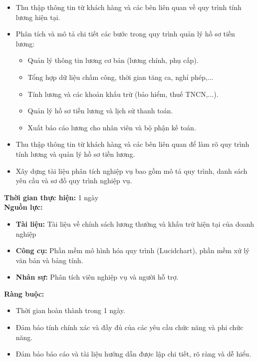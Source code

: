 {\begin{minipage}{\textwidth}
\begin{itemize}
        \begin{itemize}
            \item Thu thập thông tin từ khách hàng và các bên liên quan về quy trình tính lương hiện tại.
            \item Phân tích và mô tả chi tiết các bước trong quy trình quản lý hồ sơ tiền lương:
            \begin{itemize}
                \item Quản lý thông tin lương cơ bản (lương chính, phụ cấp).
                \item Tổng hợp dữ liệu chấm công, thời gian tăng ca, nghỉ phép,...
                \item Tính lương và các khoản khấu trừ (bảo hiểm, thuế TNCN,...).
                \item Quản lý hồ sơ tiền lương và lịch sử thanh toán.
                \item Xuất báo cáo lương cho nhân viên và bộ phận kế toán.
            \end{itemize}
            \item Thu thập thông tin từ khách hàng và các bên liên quan để làm rõ quy trình tính lương và quản lý hồ sơ tiền lương.
            \item Xây dựng tài liệu phân tích nghiệp vụ bao gồm mô tả quy trình, danh sách yêu cầu và sơ đồ quy trình nghiệp vụ.
        \end{itemize}
    \end{itemize}
    \vspace{0.5cm}
    \noindent \textbf{Thời gian thực hiện:} 1 ngày \\
    \noindent \textbf{Nguồn lực:}
    \begin{itemize}
        \item \textbf{Tài liệu:} Tài liệu về chính sách lương thưởng và khấu trừ hiện tại của doanh nghiệp
        \item \textbf{Công cụ:} Phần mềm mô hình hóa quy trình (Lucidchart), phần mềm xử lý văn bản và bảng tính.
        \item \textbf{Nhân sự:} Phân tích viên nghiệp vụ và người hỗ trợ.
    \end{itemize}
    \vspace{0.5cm}
    \noindent \textbf{Ràng buộc:}
    \begin{itemize}
        \item Thời gian hoàn thành trong 1 ngày.
        \item Đảm bảo tính chính xác và đầy đủ của các yêu cầu chức năng và phi chức năng.
        \item Đảm bảo báo cáo và tài liệu hướng dẫn được lập chi tiết, rõ ràng và dễ hiểu.
    \end{itemize}
    \end{minipage}
}

